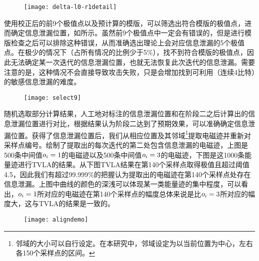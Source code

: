{	\begin{figure}[!h]
		\begin{center}
			\texttt{[image: delta-l0-r1detail]}
			\label{fig:delta-l0-r1detail}
		\end{center}
	\end{figure}

	使用校正后的前9个极值点以及预计算的模版，可以筛选出符合模版的极值点，进而确定信息泄漏位置，如所示。虽然前9个极值点中一定会有错误的，但是进行模版检查之后可以排除这种错误，从而准确选出理论上会对应信息泄漏的5个极值点。在极少的情况下（占所有情况的比例少于5\%），找不到符合模版的极值点，因此无法确定某一次迭代的信息泄漏位置，也就无法恢复此次迭代的信息泄漏。需要注意的是，这种情况不会直接导致攻击失败，只是会增加找到可利用（连续4比特）的敏感信息泄漏的难度。
	
	\begin{figure}[!h]
		\begin{center}
			\texttt{[image: select9]}
			\label{fig:select9}
		\end{center}
	\end{figure}

	随机选取部分计算结果，人工地对标注的信息泄漏位置和在阶段二之后计算出的信息泄漏位置进行对比，根据结果认为阶段二达到了预期效果，可以准确确定信息泄漏位置。获得了信息泄漏位置后，我们从相应位置及其邻域\footnote{邻域的大小可以自行设定。在本研究中，邻域设定为以当前位置为中心，左右各150个采样点的区间。}提取电磁迹并重新对采样点编号。绘制了提取出的每次迭代的第二处包含信息泄漏的电磁迹，上图是500条中间值$o_i=1$的电磁迹以及500条中间值$o_i=3$的电磁迹，下图是这1000条能量迹进行TVLA的结果。从下图TVLA结果在第140个采样点取得极值且超过阈值4.5，因此我们有超过99.999\%的把握认为提取出的电磁迹在第140个采样点处存在信息泄漏。上图中曲线的颜色的深浅可以体现某一类能量迹的集中程度，可以看出，$o_i=1$所对应的电磁迹在第140个采样点的幅度总体来说是比$o_i=3$所对应的幅度大，这与TVLA的结果是一致的。
	
	\begin{figure}[!h]
		\begin{center}
			\texttt{[image: aligndemo]}
			\label{fig:aligndemo}
		\end{center}
	\end{figure}

}
